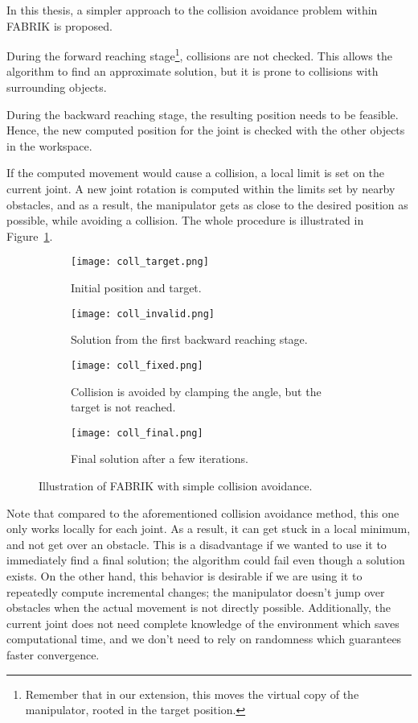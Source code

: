 In this thesis, a simpler approach to the collision avoidance problem within FABRIK is proposed.


During the forward reaching stage\footnote{Remember that in our extension, this moves the virtual copy of the manipulator, rooted in the target position.}, collisions are not checked. This allows the algorithm to find an approximate solution, but it is prone to collisions with surrounding objects.


During the backward reaching stage, the resulting position needs to be feasible. Hence, the new computed position for the joint is checked with the other objects in the workspace.

If the computed movement would cause a collision, a local limit is set on the current joint. A new joint rotation is computed within the limits set by nearby obstacles, and as a result, the manipulator gets as close to the desired position as possible, while avoiding a collision. The whole procedure is illustrated in Figure~\ref{fig:coll}.

\begin{figure}
    \centering
    \begin{subfigure}{.24\textwidth}
      \texttt{[image: coll\_target.png]}
      \caption{Initial position and target.}
    \end{subfigure}
    \begin{subfigure}{0.24\textwidth}
      \texttt{[image: coll\_invalid.png]}
      \caption{Solution from the first backward reaching stage.}
    \end{subfigure}
    \begin{subfigure}{.24\textwidth}
      \texttt{[image: coll\_fixed.png]}
      \caption{Collision is avoided by clamping the angle, but the target is not reached.}
    \end{subfigure}
    \begin{subfigure}{.24\textwidth}
      \texttt{[image: coll\_final.png]}
      \caption{Final solution after a few iterations.}
    \end{subfigure}
    \caption{Illustration of FABRIK with simple collision avoidance.}\label{fig:coll}
\end{figure}
  
Note that compared to the aforementioned collision avoidance method, this one only works locally for each joint. As a result, it can get stuck in a local minimum, and not get over an obstacle. This is a disadvantage if we wanted to use it to immediately find a final solution; the algorithm could fail even though a solution exists. On the other hand, this behavior is desirable if we are using it to repeatedly compute incremental changes; the manipulator doesn't jump over obstacles when the actual movement is not directly possible. Additionally, the current joint does not need complete knowledge of the environment which saves computational time, and we don't need to rely on randomness which guarantees faster convergence.

